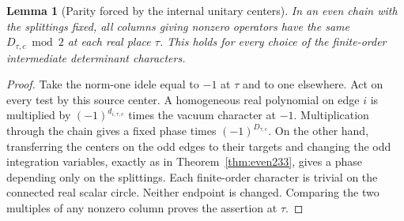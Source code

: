 \documentclass[a4paper,11pt]{article}
\newtheorem{lemma}[proposition]{Lemma}
\theoremstyle{definition}
\theoremstyle{remark}
\numberwithin{equation}{section}
\begin{document}
\begin{lemma}[Parity forced by the internal unitary centers]
\label{lem:parity233}
In an even chain with the splittings fixed, all columns giving
nonzero operators have the same \(D_{\tau,c}\bmod 2\) at each real
place \(\tau\). This holds for every choice of the finite-order
intermediate determinant characters.
\end{lemma}
\begin{proof}
Take the norm-one idele equal to \(-1\) at \(\tau\) and to one
elsewhere. Act on every test by this source center. A homogeneous
real polynomial on edge \(i\) is multiplied by
\((-1)^{d_{i,\tau,c}}\) times the vacuum character at \(-1\).
Multiplication through the chain gives a fixed phase times
\((-1)^{D_{\tau,c}}\). On the other hand, transferring the centers
on the odd edges to their targets and changing the odd integration
variables, exactly as in Theorem~\ref{thm:even233}, gives
a phase depending only on the splittings. Each finite-order character
is trivial on the connected real scalar circle. Neither endpoint
is changed. Comparing the two multiples of any nonzero column
proves the assertion at \(\tau\).
\end{proof}
\end{document}
